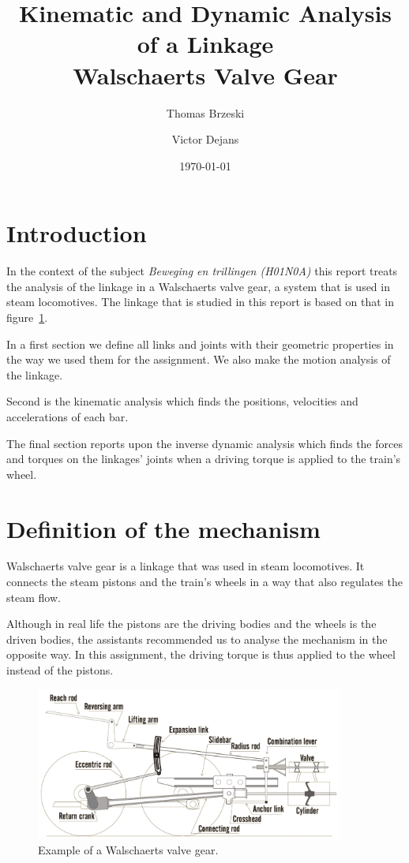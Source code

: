 \documentclass[a4paper]{article}
\date{\today}
\author{Thomas Brzeski \and  Victor Dejans}
\title{Kinematic and Dynamic Analysis of a Linkage\\ Walschaerts Valve Gear}
\begin{document}
\maketitle

\section*{Introduction}

In the context of the subject \textit{Beweging en trillingen (H01N0A)} this report treats the analysis of the linkage in a Walschaerts valve gear, a system that is used in steam locomotives. The linkage that is studied in this report is based on that in figure~\ref{fig:basistekening}.

In a first section we define all links and joints with their geometric properties in the way we used them for the assignment. We also make the motion analysis of the linkage.

Second is the kinematic analysis which finds the positions, velocities and accelerations of each bar.

The final section reports upon the inverse dynamic analysis which finds the forces and torques on the linkages' joints when a driving torque is applied to the train's wheel.



\tableofcontents
\clearpage

\section{Definition of the mechanism}

Walschaerts valve gear is a linkage that was used in steam locomotives. It connects the steam pistons and the train's wheels in a way that also regulates the steam flow.

Although in real life the pistons are the driving bodies and the wheels is the driven bodies, the assistants recommended us to analyse the mechanism in the opposite way. In this assignment, the driving torque is thus applied to the wheel instead of the pistons.

\begin{figure}[h]
	\includegraphics[width=0.9\textwidth]{wvgverslag.png}
	\centering
	\caption{Example of a Walschaerts valve gear. \cite{ove06}}
	\label{fig:basistekening}
\end{figure}
\end{document}
